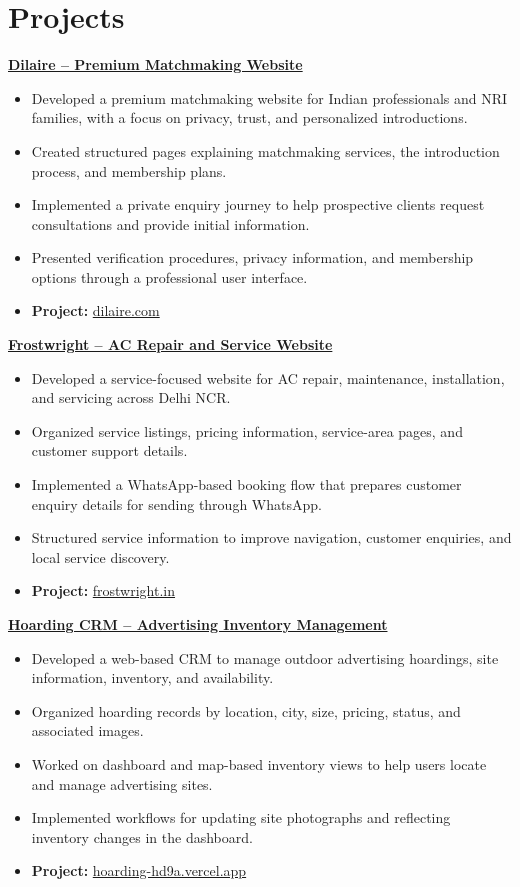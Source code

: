\documentclass[a4paper,10pt]{article}
\begin{document}
\section*{Projects}
\vspace{2pt}
\noindent \textbf{\href{https://dilaire.com/}{Dilaire -- Premium Matchmaking Website}}
\begin{itemize}
    \item Developed a premium matchmaking website for Indian professionals and NRI families, with a focus on privacy, trust, and personalized introductions.
    \item Created structured pages explaining matchmaking services, the introduction process, and membership plans.
    \item Implemented a private enquiry journey to help prospective clients request consultations and provide initial information.
    \item Presented verification procedures, privacy information, and membership options through a professional user interface.
    \item \textbf{Project:} \href{https://dilaire.com/}{dilaire.com}
\end{itemize}

\vspace{4pt}
\noindent \textbf{\href{https://frostwright.in/}{Frostwright -- AC Repair and Service Website}}
\begin{itemize}
    \item Developed a service-focused website for AC repair, maintenance, installation, and servicing across Delhi NCR.
    \item Organized service listings, pricing information, service-area pages, and customer support details.
    \item Implemented a WhatsApp-based booking flow that prepares customer enquiry details for sending through WhatsApp.
    \item Structured service information to improve navigation, customer enquiries, and local service discovery.
    \item \textbf{Project:} \href{https://frostwright.in/}{frostwright.in}
\end{itemize}

\clearpage

\noindent \textbf{\href{https://hoarding-hd9a.vercel.app/}{Hoarding CRM -- Advertising Inventory Management}}
\begin{itemize}
    \item Developed a web-based CRM to manage outdoor advertising hoardings, site information, inventory, and availability.
    \item Organized hoarding records by location, city, size, pricing, status, and associated images.
    \item Worked on dashboard and map-based inventory views to help users locate and manage advertising sites.
    \item Implemented workflows for updating site photographs and reflecting inventory changes in the dashboard.
    \item \textbf{Project:} \href{https://hoarding-hd9a.vercel.app/}{hoarding-hd9a.vercel.app}
\end{itemize}
\end{document}
